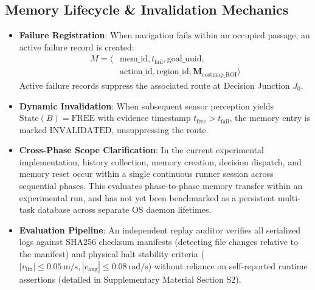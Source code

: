 \subsection{Memory Lifecycle \& Invalidation Mechanics}
\begin{itemize}
    \item \textbf{Failure Registration}: When navigation fails within an occupied passage, an active failure record is created:
    \begin{align}
    M = \langle &\text{mem\_id}, t_{\text{fail}}, \text{goal\_uuid}, \nonumber\\
                &\text{action\_id}, \text{region\_id}, \mathbf{M}_{\text{costmap\_ROI}} \rangle
    \end{align}
    Active failure records suppress the associated route at Decision Junction $J_0$.
    \item \textbf{Dynamic Invalidation}: When subsequent sensor perception yields $\text{State}(B) = \text{FREE}$ with evidence timestamp $t_{\text{free}} > t_{\text{fail}}$, the memory entry is marked $\text{INVALIDATED}$, unsuppressing the route.
    \item \textbf{Cross-Phase Scope Clarification}: In the current experimental implementation, history collection, memory creation, decision dispatch, and memory reset occur within a single continuous runner session across sequential phases. This evaluates phase-to-phase memory transfer within an experimental run, and has not yet been benchmarked as a persistent multi-task database across separate OS daemon lifetimes.
    \item \textbf{Evaluation Pipeline}: An independent replay auditor verifies all serialized logs against SHA256 checksum manifests (detecting file changes relative to the manifest) and physical halt stability criteria ($|v_{\text{lin}}| \le 0.05\,\text{m/s}, |v_{\text{ang}}| \le 0.08\,\text{rad/s}$) without reliance on self-reported runtime assertions (detailed in Supplementary Material Section S2).
\end{itemize}
